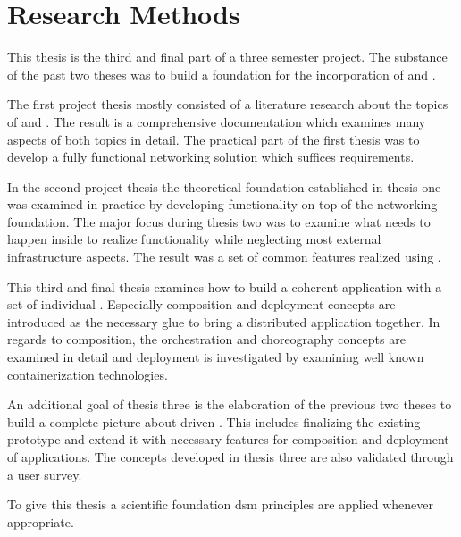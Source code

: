 \chapter{Research Methods}

This thesis is the third and final part of a three semester project. The
substance of the past two theses was to build a foundation for the incorporation
of \mss{} and \ogs{}. 

The first project thesis \cite{biedermann2015project1} mostly consisted of a
literature research about the topics of \ogs{} and \mss{}. The result is a
comprehensive documentation which examines many aspects of both topics in
detail. The practical part of the first thesis was to develop a fully functional
\ms{} networking solution which suffices \og{} requirements.

In the second project thesis \cite{biedermann2016project2} the theoretical
foundation established in thesis one was examined in practice by developing
\og{} functionality on top of the networking foundation. The major focus during
thesis two was to examine what needs to happen inside \mss{} to realize \og{}
functionality while neglecting most external infrastructure aspects. The result
was a set of common \og{} features realized using \mss{}.

This third and final thesis examines how to build a coherent application with
a set of individual \mss{}. Especially composition and deployment
concepts are introduced as the necessary glue to bring a distributed application
together. In regards to composition, the orchestration and choreography concepts
are examined in detail and deployment is investigated by examining well known
containerization technologies.

An additional goal of thesis three is the elaboration of the previous two theses
to build a complete picture about \ms{} driven \ogs{}. This includes finalizing
the existing prototype and extend it with necessary features for composition and
deployment of \ms{} applications. The concepts developed in thesis three are
also validated through a user survey.

To give this thesis a scientific foundation \gls{dsm} principles are applied
whenever appropriate.



 
















